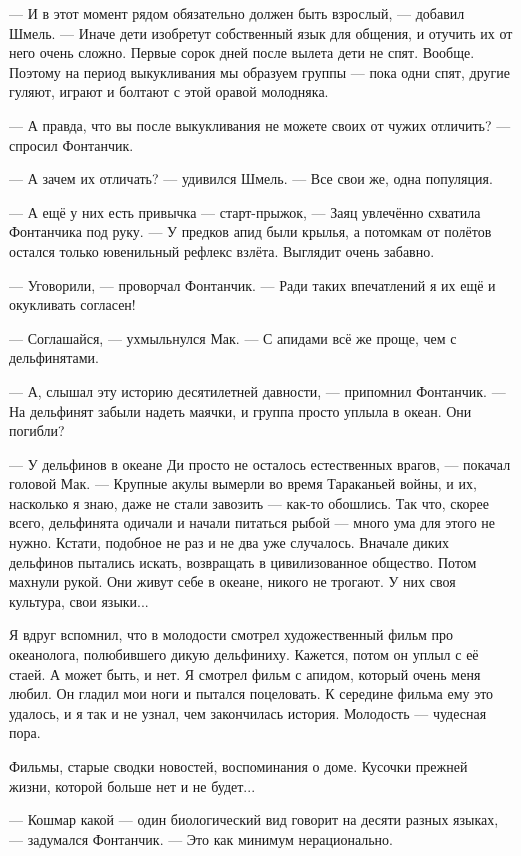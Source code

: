 --- И в этот момент рядом обязательно должен быть взрослый, --- добавил Шмель.
--- Иначе дети изобретут собственный язык для общения, и отучить их от него очень сложно.
Первые сорок дней после вылета дети не спят.
Вообще.
Поэтому на период выкукливания мы образуем группы --- пока одни спят, другие гуляют, играют и болтают с этой оравой молодняка.

--- А правда, что вы после выкукливания не можете своих от чужих отличить? --- спросил Фонтанчик.

--- А зачем их отличать? --- удивился Шмель.
--- Все свои же, одна популяция.

--- А ещё у них есть привычка --- старт-прыжок, --- Заяц увлечённо схватила Фонтанчика под руку.
--- У предков апид были крылья, а потомкам от полётов остался только ювенильный рефлекс взлёта.
Выглядит очень забавно.

--- Уговорили, --- проворчал Фонтанчик.
--- Ради таких впечатлений я их ещё и окукливать согласен!

--- Соглашайся, --- ухмыльнулся Мак.
--- С апидами всё же проще, чем с дельфинятами.

--- А, слышал эту историю десятилетней давности, --- припомнил Фонтанчик.
--- На дельфинят забыли надеть маячки, и группа просто уплыла в океан.
Они погибли?

--- У дельфинов в океане Ди просто не осталось естественных врагов, --- покачал головой Мак.
--- Крупные акулы вымерли во время Тараканьей войны, и их, насколько я знаю, даже не стали завозить --- как-то обошлись.
Так что, скорее всего, дельфинята одичали и начали питаться рыбой --- много ума для этого не нужно.
Кстати, подобное не раз и не два уже случалось.
Вначале диких дельфинов пытались искать, возвращать в цивилизованное общество.
Потом махнули рукой.
Они живут себе в океане, никого не трогают.
У них своя культура, свои языки...

Я вдруг вспомнил, что в молодости смотрел художественный фильм про океанолога, полюбившего дикую дельфиниху.
Кажется, потом он уплыл с её стаей.
А может быть, и нет.
Я смотрел фильм с апидом, который очень меня любил.
Он гладил мои ноги и пытался поцеловать.
К середине фильма ему это удалось, и я так и не узнал, чем закончилась история.
Молодость --- чудесная пора.

Фильмы, старые сводки новостей, воспоминания о доме.
Кусочки прежней жизни, которой больше нет и не будет...

--- Кошмар какой --- один биологический вид говорит на десяти разных языках, --- задумался Фонтанчик.
--- Это как минимум нерационально.

